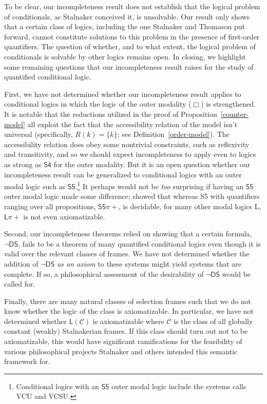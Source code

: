 \documentclass[12pt]{article}
\newcommand{\nec}{\mathop{\Box}}
\begin{document}
To be clear, our incompleteness result does not establish that the logical problem of conditionals, as Stalnaker conceived it, is unsolvable. 
Our result only shows that a certain class of logics, including the one Stalnaker and Thomason put forward, cannot constitute solutions to this problem in the presence of first-order quantifiers. 
The question of whether, and to what extent, the logical problem of conditionals is solvable by other logics remains open. 
In closing, we highlight some remaining questions that our incompleteness result raises for the study of quantified conditional logic. 

First, we have not determined whether our incompleteness result applies to conditional logics in which the logic of the outer modality ($\nec$) is strengthened. 
It is notable that the reductions utilized in the proof of Proposition~\ref{counter-model} all exploit the fact that the accessibility relation of the model isn't universal (specifically, $R(k) = \{k\}$; see Definition~\ref{order-model}). 
The accessibility relation does obey some nontrivial constraints, such as reflexivity and transitivity, and so we should expect incompleteness to apply even to logics as strong as $\mathsf{S4}$ for the outer modality. 
But it is an open question whether our incompleteness result can be generalized to conditional logics with an outer modal logic such as $\mathsf{S5}$.\footnote{Conditional logics with an $\mathsf{S5}$ outer modal logic include the systems \cite[pp.~137--138]{Lewis1973} calls \textsf{VCU} and \textsf{VCSU}.} It perhaps would not be \textit{too} surprising if having an $\mathsf{S5}$ outer modal logic made some difference; \cite{Fine1970propquantifiers} showed that whereas \textsf{S5} with quantifiers ranging over all propositions, $\mathsf{S5}\pi+$, is decidable, for many other modal logics \textsf{L}, $\mathsf{L}\pi+$ is not even axiomatizable. 

Second, our incompleteness theorems relied on showing that a certain formula, $\neg\mathsf{DS}$, fails to be a theorem of many quantified conditional logics even though it is valid over the relevant classes of frames. 
We have not determined whether the addition of $\neg\mathsf{DS}$ \textit{as an axiom} to these systems might yield systems that are complete. 
If so, a philosophical assessment of the desirability of $\neg\mathsf{DS}$ would be called for. 

Finally, there are many natural classes of selection frames such that we do not know whether the logic of the class is axiomatizable. In particular, we have not determined whether $\mathsf{L}(\mathcal{C})$ is axiomatizable where $\mathcal{C}$ is the class of all globally constant (weakly) Stalnakerian frames. 
If this class should turn out not to be axiomatizable, this would have significant ramifications for the feasibility of various philosophical projects Stalnaker and others intended this semantic framework for. 
\end{document}

